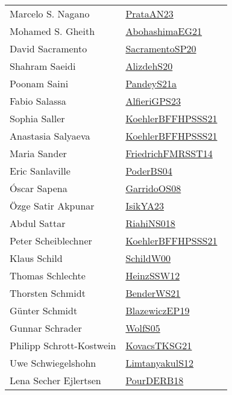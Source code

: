 {\begin{longtable}{p{4cm}p{20cm}}
Marcelo S. Nagano & \href{works/PrataAN23.pdf}{PrataAN23}~\cite{PrataAN23}\\
Mohamed S. Gheith & \href{works/AbohashimaEG21.pdf}{AbohashimaEG21}~\cite{AbohashimaEG21}\\
David Sacramento & \href{works/SacramentoSP20.pdf}{SacramentoSP20}~\cite{SacramentoSP20}\\
Shahram Saeidi & \href{}{AlizdehS20}~\cite{AlizdehS20}\\
Poonam Saini & \href{works/PandeyS21a.pdf}{PandeyS21a}~\cite{PandeyS21a}\\
Fabio Salassa & \href{works/AlfieriGPS23.pdf}{AlfieriGPS23}~\cite{AlfieriGPS23}\\
Sophia Saller & \href{works/KoehlerBFFHPSSS21.pdf}{KoehlerBFFHPSSS21}~\cite{KoehlerBFFHPSSS21}\\
Anastasia Salyaeva & \href{works/KoehlerBFFHPSSS21.pdf}{KoehlerBFFHPSSS21}~\cite{KoehlerBFFHPSSS21}\\
Maria Sander & \href{}{FriedrichFMRSST14}~\cite{FriedrichFMRSST14}\\
Eric Sanlaville & \href{works/PoderBS04.pdf}{PoderBS04}~\cite{PoderBS04}\\
{\'{O}}scar Sapena & \href{works/GarridoOS08.pdf}{GarridoOS08}~\cite{GarridoOS08}\\
{\"{O}}zge Satir Akpunar & \href{works/IsikYA23.pdf}{IsikYA23}~\cite{IsikYA23}\\
Abdul Sattar & \href{works/RiahiNS018.pdf}{RiahiNS018}~\cite{RiahiNS018}\\
Peter Scheiblechner & \href{works/KoehlerBFFHPSSS21.pdf}{KoehlerBFFHPSSS21}~\cite{KoehlerBFFHPSSS21}\\
Klaus Schild & \href{works/SchildW00.pdf}{SchildW00}~\cite{SchildW00}\\
Thomas Schlechte & \href{works/HeinzSSW12.pdf}{HeinzSSW12}~\cite{HeinzSSW12}\\
Thorsten Schmidt & \href{works/BenderWS21.pdf}{BenderWS21}~\cite{BenderWS21}\\
Günter Schmidt & \href{}{BlazewiczEP19}~\cite{BlazewiczEP19}\\
Gunnar Schrader & \href{works/WolfS05.pdf}{WolfS05}~\cite{WolfS05}\\
Philipp Schrott{-}Kostwein & \href{works/KovacsTKSG21.pdf}{KovacsTKSG21}~\cite{KovacsTKSG21}\\
Uwe Schwiegelshohn & \href{works/LimtanyakulS12.pdf}{LimtanyakulS12}~\cite{LimtanyakulS12}\\
Lena Secher Ejlertsen & \href{works/PourDERB18.pdf}{PourDERB18}~\cite{PourDERB18}\\

\end{longtable}}
